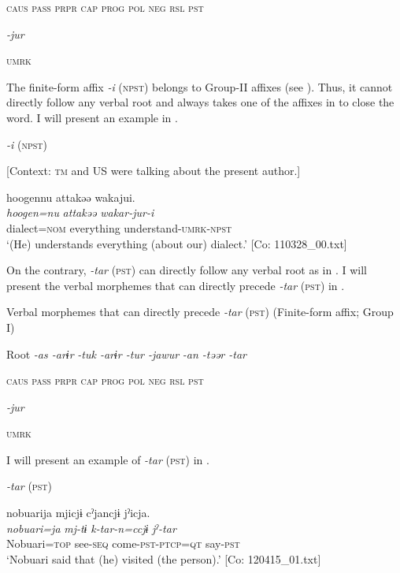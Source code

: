     \textsc{caus}  \textsc{pass}  \textsc{prpr}  \textsc{cap}  \textsc{prog}  \textsc{pol}  \textsc{neg}  \textsc{rsl}  \textsc{pst}

          \textit{-jur}

          \textsc{umrk}
\z

The finite-form affix \textit{-i} (\textsc{npst}) belongs to Group-II affixes (see ). Thus, it cannot directly follow any verbal root and always takes one of the affixes in  to close the word. I will present an example in .

\ea\label{ex:8-54}
  \textit{-i} (\textsc{npst})

  [Context: \textsc{tm} and US were talking about the present author.]

  {\TM}
\glll  {\textbar}hoogen{\textbar}nu  attakəə  wakajui.\\
\textit{hoogen=nu}  \textit{attakəə}  \textit{wakar-jur-i}\\
    dialect=\textsc{nom}  everything  understand-\textsc{umrk}-\textsc{npst}\\
\glt ‘(He) understands everything (about our) dialect.’ [Co: 110328\_00.txt]
\z

  On the contrary, \textit{-tar} (\textsc{pst}) can directly follow any verbal root as in . I will present the verbal morphemes that can directly precede \textit{-tar} (\textsc{pst}) in .

\ea\label{ex:8-55}
  Verbal morphemes that can directly precede \textit{-tar} (\textsc{pst}) (Finite-form affix; Group I)

  Root  \textit{-as  -arɨr} %
\textit{-tuk  -arɨr  -tur  -jawur} %
\textit{-an  -təər  -tar}

    \textsc{caus}  \textsc{pass}  \textsc{prpr}  \textsc{cap}  \textsc{prog}  \textsc{pol}  \textsc{neg}  \textsc{rsl}  \textsc{pst}

          \textit{-jur}

          \textsc{umrk}
\z

I will present an example of \textit{-tar} (\textsc{pst}) in .

\ea\label{ex:8-56}
  \textit{-tar} (\textsc{pst})

  {\TM}
\glll  nobuarija  mjicjɨ  cˀjancjɨ  jˀicja.\\
\textit{nobuari=ja}  \textit{mj-tɨ}  \textit{k-tar-n=ccjɨ}  \textit{jˀ-tar}\\
    Nobuari=\textsc{top}  see-\textsc{seq}  come-\textsc{pst}-\textsc{ptcp}=\textsc{qt}  say-\textsc{pst}\\
\glt ‘Nobuari said that (he) visited (the person).’ [Co: 120415\_01.txt]
\z

